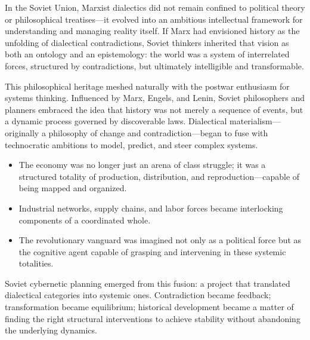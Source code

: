 \begin{tcolorbox}[colback=gray!10, colframe=black, title={Sidebar: From Marxist Dialectics to Soviet Cybernetic Planning}, fonttitle=\bfseries, breakable]

    In the Soviet Union, Marxist dialectics did not remain confined to political theory or philosophical treatises—it evolved into an ambitious intellectual framework for understanding and managing reality itself. If Marx had envisioned history as the unfolding of dialectical contradictions, Soviet thinkers inherited that vision as both an ontology and an epistemology: the world was a system of interrelated forces, structured by contradictions, but ultimately intelligible and transformable.
    
    \medskip
    
    This philosophical heritage meshed naturally with the postwar enthusiasm for systems thinking. Influenced by Marx, Engels, and Lenin, Soviet philosophers and planners embraced the idea that history was not merely a sequence of events, but a dynamic process governed by discoverable laws. Dialectical materialism—originally a philosophy of change and contradiction—began to fuse with technocratic ambitions to model, predict, and steer complex systems.
    
    \medskip
    
    \begin{itemize}
      \item The economy was no longer just an arena of class struggle; it was a structured totality of production, distribution, and reproduction—capable of being mapped and organized.
      \item Industrial networks, supply chains, and labor forces became interlocking components of a coordinated whole.
      \item The revolutionary vanguard was imagined not only as a political force but as the cognitive agent capable of grasping and intervening in these systemic totalities.
    \end{itemize}
    
    \medskip
    
    Soviet cybernetic planning emerged from this fusion: a project that translated dialectical categories into systemic ones. Contradiction became feedback; transformation became equilibrium; historical development became a matter of finding the right structural interventions to achieve stability without abandoning the underlying dynamics.
    

\end{tcolorbox}
